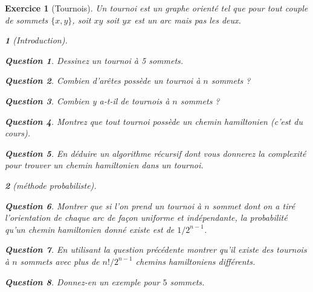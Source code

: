 \documentclass{article}
\theoremstyle{exostyle}
\newtheorem{exo}{Exercice}
\theoremstyle{partiestyle}
\newtheorem{partie}{}[exo]
\theoremstyle{questionstyle}
\newtheorem{questionpartie}{Question}[partie]
\begin{document}
\begin{exo}[Tournois]
Un tournoi est un graphe orienté tel que pour  tout couple de sommets $\{x, y\}$, soit $xy$ soit $yx$ est un arc mais pas les deux.

\begin{partie}[Introduction]
	\begin{questionpartie}
		Dessinez un tournoi à 5 sommets.
	\end{questionpartie}
	\begin{questionpartie}
		Combien d'arêtes possède un tournoi à $n$ sommets ?
	\end{questionpartie}
	\begin{questionpartie}
		Combien y a-t-il de tournois à $n$ sommets ?
	\end{questionpartie}
	\begin{questionpartie}
		Montrez que tout tournoi possède un chemin hamiltonien (c'est du cours).
	\end{questionpartie}
	\begin{questionpartie}
		En déduire un algorithme récursif dont vous donnerez la complexité pour trouver un chemin hamiltonien dans un tournoi.
	\end{questionpartie}
\end{partie}
\begin{partie}[méthode probabiliste]
	\begin{questionpartie}
		Montrer que si l'on prend un tournoi à $n$ sommet dont on a tiré l'orientation de chaque arc de façon uniforme et indépendante, la probabilité qu'un chemin hamiltonien donné existe est de $1/2^{n-1}$.
	\end{questionpartie}
	\begin{questionpartie}
		En utilisant la question précédente montrer qu'il existe des tournois à $n$ sommets avec plus de $n!/2^{n-1}$ chemins hamiltoniens différents.
	\end{questionpartie}
	\begin{questionpartie}
		Donnez-en un exemple pour $5$ sommets. 
	\end{questionpartie}
\end{partie}


\end{exo}
\end{document}
